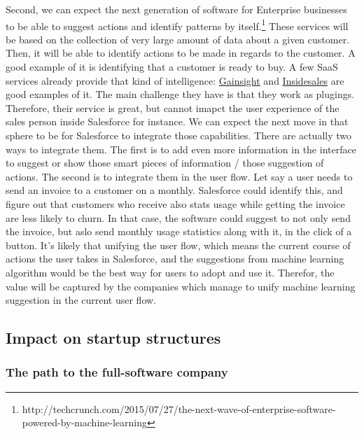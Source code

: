 \documentclass[12pt]{article}
\begin{document}
Second, we can expect the next generation of software for Enterprise businesses to be able to suggest actions and identify patterns by itself.\footnote{http://techcrunch.com/2015/07/27/the-next-wave-of-enterprise-software-powered-by-machine-learning} These services will be based on the collection of very large amount of data about a given customer. Then, it will be able to identify actions to be made in regards to the customer. A good example of it is identifying that a customer is ready to buy. A few SaaS services already provide that kind of intelligence: \href{http://www.gainsight.com/}{Gainsight} and \href{http://uk.insidesales.com/}{Insidesales} are good examples of it.
The main challenge they have is that they work as plugings. Therefore, their service is great, but cannot imapct the user experience of the sales person inside Salesforce for instance.
We can expect the next move in that sphere to be for Salesforce to integrate those capabilities. There are actually two ways to integrate them. The first is to add even more information in the interface to suggest or show those smart pieces of information / those suggestion of actions. The second is to integrate them in the user flow. Let say a user needs to send an invoice to a customer on a monthly. Salesforce could identify this, and figure out that customers who receive also stats usage while getting the invoice are less likely to churn. In that case, the software could suggest to not only send the invoice, but aslo send monthly usage statistics along with it, in the click of a button.
It's likely that unifying the user flow, which means the current course of actions the user takes in Salesforce, and the suggestions from machine learning algorithm would be the best way for users to adopt and use it. Therefor, the value will be captured by the companies which manage to unify machine learning suggestion in the current user flow.

\subsection{Impact on startup structures}

\subsubsection{The path to the full-software company}
\end{document}
